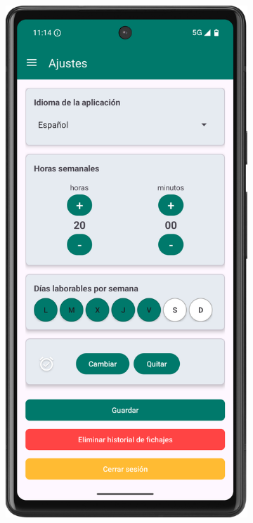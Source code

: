 \begin{figure}[H]
     \centering
     \begin{subfigure}[b]{0.3\textwidth}
         \centering
         \includegraphics[width=\textwidth]{root/settings-1.png}

\end{subfigure}
\end{figure}
